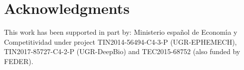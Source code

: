 \documentclass[conference]{IEEEtran}
\begin{document}
\section*{Acknowledgments}

This work has been supported in part by: Ministerio espa\~{n}ol de
Econom\'{\i}a y Competitividad under project TIN2014-56494-C4-3-P
(UGR-EPHEMECH), TIN2017-85727-C4-2-P (UGR-DeepBio) and TEC2015-68752 (also funded by FEDER).




\end{document}
